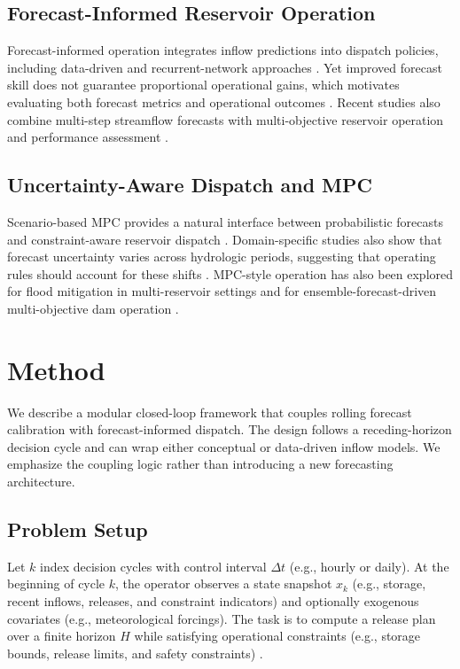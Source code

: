 \documentclass[conference]{IEEEtran}
\begin{document}
\subsection{Forecast-Informed Reservoir Operation}
Forecast-informed operation integrates inflow predictions into dispatch policies, including
data-driven and recurrent-network approaches \cite{yang2019real,zarei2021machine,sushanth2023real}.
Yet improved forecast skill does not guarantee proportional operational gains, which motivates
evaluating both forecast metrics and operational outcomes \cite{turner2017complex}.
Recent studies also combine multi-step streamflow forecasts with multi-objective reservoir
operation and performance assessment \cite{guo2021ai}.

\subsection{Uncertainty-Aware Dispatch and MPC}
Scenario-based MPC provides a natural interface between probabilistic forecasts and
constraint-aware reservoir dispatch \cite{cestari2023scenario,mayne2000constrained}. Domain-specific
studies also show that forecast uncertainty varies across hydrologic periods, suggesting that
operating rules should account for these shifts \cite{liu2020reservoir}.
MPC-style operation has also been explored for flood mitigation in multi-reservoir settings
and for ensemble-forecast-driven multi-objective dam operation \cite{myolin2018flood,tanhapour2025development}.

\section{Method}
We describe a modular closed-loop framework that couples rolling forecast calibration with
forecast-informed dispatch. The design follows a receding-horizon decision cycle and can wrap
either conceptual or data-driven inflow models. We emphasize the coupling logic rather than
introducing a new forecasting architecture.

\subsection{Problem Setup}
Let $k$ index decision cycles with control interval $\Delta t$ (e.g., hourly or daily). At the
beginning of cycle $k$, the operator observes a state snapshot $x_k$ (e.g., storage, recent
inflows, releases, and constraint indicators) and optionally exogenous covariates (e.g.,
meteorological forcings). The task is to compute a release plan
over a finite horizon $H$ while satisfying operational constraints (e.g., storage bounds,
release limits, and safety constraints) \cite{yeh1985reservoir,labadie2004optimal}.
\end{document}

